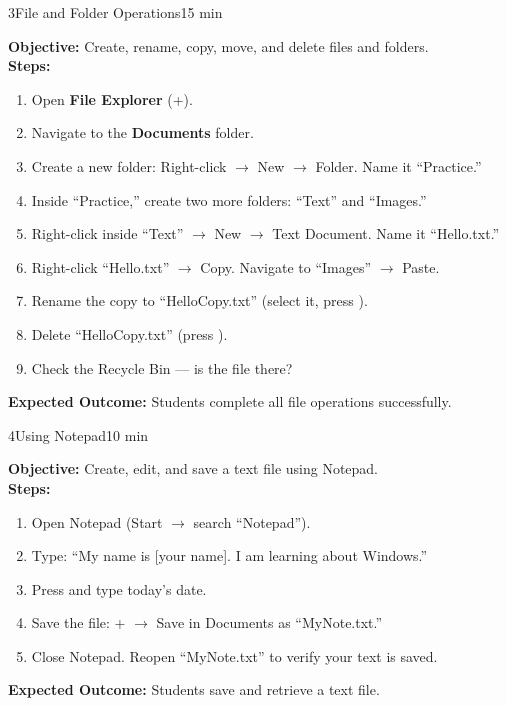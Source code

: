 \begin{labactivity}{3}{File and Folder Operations}{15 min}

\textbf{Objective:} Create, rename, copy, move, and delete files and folders.\\[4pt]
\textbf{Steps:}
\begin{enumerate}[label=\protect\stepcircle{\arabic*}, leftmargin=2cm, itemsep=4pt]
  \item Open \textbf{File Explorer} (+).
  \item Navigate to the \textbf{Documents} folder.
  \item Create a new folder: Right-click $\rightarrow$ New $\rightarrow$ Folder. Name it ``Practice.''
  \item Inside ``Practice,'' create two more folders: ``Text'' and ``Images.''
  \item Right-click inside ``Text'' $\rightarrow$ New $\rightarrow$ Text Document. Name it ``Hello.txt.''
  \item Right-click ``Hello.txt'' $\rightarrow$ Copy. Navigate to ``Images'' $\rightarrow$ Paste.
  \item Rename the copy to ``HelloCopy.txt'' (select it, press ).
  \item Delete ``HelloCopy.txt'' (press ).
  \item Check the Recycle Bin --- is the file there?
\end{enumerate}
\textbf{Expected Outcome:} Students complete all file operations successfully.
\welldone
\end{labactivity}

\begin{labactivity}{4}{Using Notepad}{10 min}

\textbf{Objective:} Create, edit, and save a text file using Notepad.\\[4pt]
\textbf{Steps:}
\begin{enumerate}[label=\protect\stepcircle{\arabic*}, leftmargin=2cm, itemsep=4pt]
  \item Open Notepad (Start $\rightarrow$ search ``Notepad'').
  \item Type: ``My name is [your name]. I am learning about Windows.''
  \item Press  and type today's date.
  \item Save the file: + $\rightarrow$ Save in Documents as ``MyNote.txt.''
  \item Close Notepad. Reopen ``MyNote.txt'' to verify your text is saved.
\end{enumerate}
\textbf{Expected Outcome:} Students save and retrieve a text file.
\welldone
\end{labactivity}

